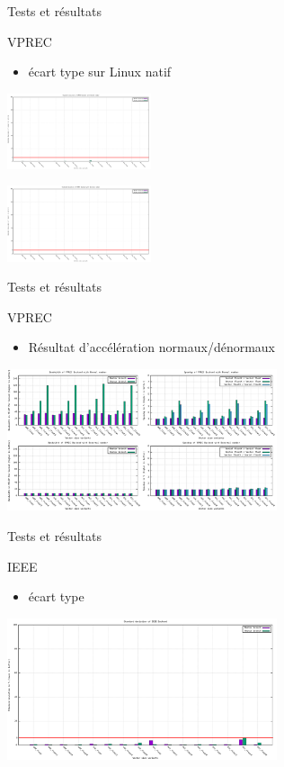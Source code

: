 \documentclass{beamer}
\begin{document}
\begin{frame}{Tests et résultats}
    \begin{block}{VPREC}
    \begin{itemize}
        \item écart type sur Linux natif
    \end{itemize}
 \centering\includegraphics[width=160px]{../ressources/laptop_vprec_normal_stddev.png}
 
  \centering\includegraphics[width=160px]{../ressources/laptop_vprec_denormal_stddev.png}
    \end{block}
\end{frame}



\begin{frame}{Tests et résultats}
    \begin{block}{VPREC}
    \begin{itemize}
        \item Résultat d'accélération normaux/dénormaux
    \end{itemize}
 \centering\includegraphics[width=300px]{../ressources/vm_vprec.png}
    \end{block}
\end{frame}

\begin{frame}{Tests et résultats}
    \begin{block}{IEEE}
    \begin{itemize}
        \item écart type
    \end{itemize}
 \centering\includegraphics[width=300px]{../ressources/vm_ieee_stddev.png}
    \end{block}

\end{frame}
\end{document}
